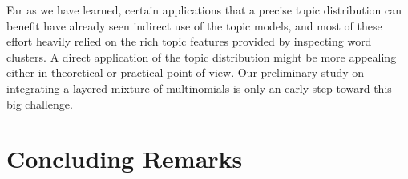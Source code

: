 Far as we have learned, certain applications that a precise topic distribution
can benefit have already seen indirect use of the topic models, and most of
these effort heavily relied on the rich topic features provided by inspecting
word clusters.  A direct application of the topic distribution might be more
appealing either in theoretical or practical point of view.  Our preliminary
study on integrating a layered mixture of multinomials is only an early step
toward this big challenge.

\section{Concluding Remarks} \label{s:concluding-remarks} 


